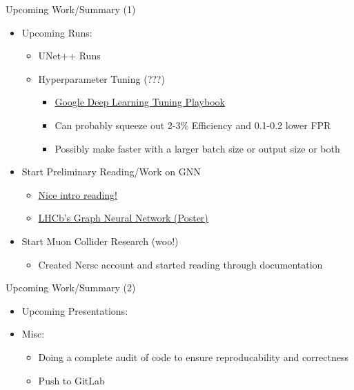 \documentclass[xcolor=table,aspectratio=169]{beamer}
\begin{document}
\begin{frame}{Upcoming Work/Summary (1)}
    \begin{itemize}
        \item Upcoming Runs:
        \begin{itemize}
            \item UNet++ Runs
            \item Hyperparameter Tuning (???)
            \begin{itemize}
                \item \href{https://github.com/google-research/tuning_playbook}{Google Deep Learning Tuning Playbook}
                \item Can probably squeeze out 2-3\% Efficiency and 0.1-0.2 lower FPR
                \item Possibly make faster with a larger batch size or output size or both
            \end{itemize}
        \end{itemize}
        \item Start Preliminary Reading/Work on GNN
        \begin{itemize}
            \item \href{https://distill.pub/2021/gnn-intro/}{Nice intro reading!}
            \item \href{https://indico.nikhef.nl/event/4875/contributions/20317/attachments/8200/11960/PVFinder_EuCAIFCon24.pdf}{LHCb's Graph Neural Network (Poster)}
        \end{itemize}
        \item Start Muon Collider Research (woo!)
        \begin{itemize}
            \item Created Nersc account and started reading through documentation
        \end{itemize}
    \end{itemize}
\end{frame}

\begin{frame}{Upcoming Work/Summary (2)}
    \begin{itemize}
        \item Upcoming Presentations:
        \item Misc:
        \begin{itemize}
            \item Doing a complete audit of code to ensure reproducability and correctness
            \item Push to GitLab
        \end{itemize}
    \end{itemize}
\end{frame}
\end{document}
